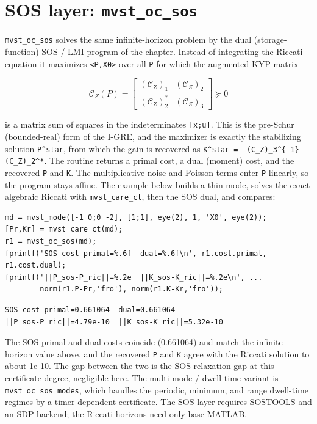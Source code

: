 \documentclass[11pt,oneside]{report}
\newcommand{\code}[1]{\texttt{#1}}
\begin{document}
\hypertarget{sos-layer-mvst_oc_sos}{%
\section{\texorpdfstring{SOS layer: \code{mvst\_oc\_sos}}{SOS layer: mvst\_oc\_sos}}\label{sos-layer-mvst_oc_sos}}

\code{mvst\_oc\_sos} solves the same infinite-horizon problem by the dual
(storage-function) SOS / LMI program of the chapter. Instead of integrating the
Riccati equation it maximizes \code{\textless{}P,X0\textgreater{}} over all \code{P} for which the augmented KYP
matrix

\[
\mathcal{C}_Z(P) =
\begin{bmatrix} (\mathcal{C}_Z)_1 & (\mathcal{C}_Z)_2 \\
                (\mathcal{C}_Z)_2^{*} & (\mathcal{C}_Z)_3 \end{bmatrix} \succeq 0
\]

is a matrix sum of squares in the indeterminates \code{[x;u]}. This is the
pre-Schur (bounded-real) form of the I-GRE, and the maximizer is exactly the
stabilizing solution \code{P\^{}star}, from which the gain is recovered as
\code{K\^{}star = -(C\_Z)\_3\^{}\{-1\}(C\_Z)\_2\^{}*}. The routine returns a primal cost, a dual
(moment) cost, and the recovered \code{P} and \code{K}. The multiplicative-noise and
Poisson terms enter \code{P} linearly, so the program stays affine. The example
below builds a thin mode, solves the exact algebraic Riccati with
\code{mvst\_care\_ct}, then the SOS dual, and compares:

\begin{lstlisting}[style=matlabstyle]
md = mvst_mode([-1 0;0 -2], [1;1], eye(2), 1, 'X0', eye(2));
[Pr,Kr] = mvst_care_ct(md);
r1 = mvst_oc_sos(md);
fprintf('SOS cost primal=%.6f  dual=%.6f\n', r1.cost.primal, r1.cost.dual);
fprintf('||P_sos-P_ric||=%.2e  ||K_sos-K_ric||=%.2e\n', ...
        norm(r1.P-Pr,'fro'), norm(r1.K-Kr,'fro'));
\end{lstlisting}

\begin{lstlisting}[style=outputstyle]
SOS cost primal=0.661064  dual=0.661064
||P_sos-P_ric||=4.79e-10  ||K_sos-K_ric||=5.32e-10
\end{lstlisting}

The SOS primal and dual costs coincide (0.661064) and match the
infinite-horizon value above, and the recovered \code{P} and \code{K} agree with the
Riccati solution to about 1e-10. The gap between the two is the SOS relaxation
gap at this certificate degree, negligible here. The multi-mode / dwell-time
variant is \code{mvst\_oc\_sos\_modes}, which handles the periodic, minimum, and range
dwell-time regimes by a timer-dependent certificate. The SOS layer requires
SOSTOOLS and an SDP backend; the Riccati horizons need only base MATLAB.
\end{document}
